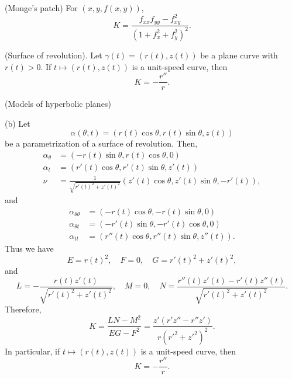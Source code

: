 \documentclass{../../large}
\begin{document}
\begin{prb}
\begin{parts}
\item
(Monge's patch)
For $(x,y,f(x,y))$,
\[K=\frac{f_{xx}f_{yy}-f_{xy}^2}{(1+f_x^2+f_y^2)^2}.\]

\item
(Surface of revolution).
Let $\gamma(t)=(r(t),z(t))$ be a plane curve with $r(t)>0$.
If $t\mapsto(r(t),z(t))$ is a unit-speed curve, then
\[K=-\frac{r''}r.\]

\item
(Models of hyperbolic planes)
\end{parts}
\end{prb}
\begin{pf}
(b)
Let
\[\alpha(\theta,t)=(r(t)\cos\theta,r(t)\sin\theta,z(t))\]
be a parametrization of a surface of revolution.
Then,
\begin{align*}
\alpha_\theta&=(-r(t)\sin\theta,r(t)\cos\theta,0)\\
\alpha_t&=(r'(t)\cos\theta,r'(t)\sin\theta,z'(t))\\
\nu&=\frac1{\sqrt{r'(t)^2+z'(t)^2}}(z'(t)\cos\theta,z'(t)\sin\theta,-r'(t)),
\end{align*}
and
\begin{align*}
\alpha_{\theta\theta}&=(-r(t)\cos\theta,-r(t)\sin\theta,0)\\
\alpha_{\theta t}&=(-r'(t)\sin\theta,-r'(t)\cos\theta,0)\\
\alpha_{tt}&=(r''(t)\cos\theta,r''(t)\sin\theta,z''(t)).
\end{align*}
Thus we have
\[E=r(t)^2,\quad F=0,\quad G=r'(t)^2+z'(t)^2,\]
and
\[L=-\frac{r(t)z'(t)}{\sqrt{r'(t)^2+z'(t)^2}},\quad M=0,\quad N=\frac{r''(t)z'(t)-r'(t)z''(t)}{\sqrt{r'(t)^2+z'(t)^2}}.\]
Therefore,
\[K=\frac{LN-M^2}{EG-F^2}=\frac{z'(r'z''-r''z')}{r(r'^2+z'^2)^2}.\]
In particular, if $t\mapsto(r(t),z(t))$ is a unit-speed curve, then
\[K=-\frac{r''}r.\]
\end{pf}



\end{document}

